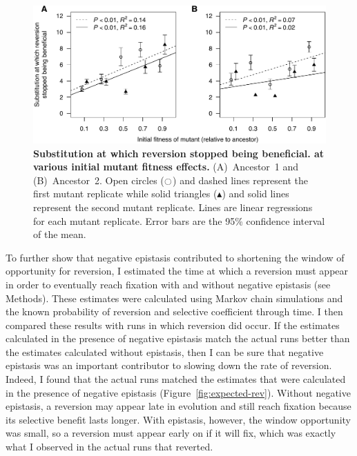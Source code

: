 \begin{doublespace}
\begin{figure}[b!]
\begin{center}
\includegraphics[width=\linewidth]{first-mut-rev-bad-W.pdf}
\end{center}
\caption{{\bf Substitution at which reversion stopped being beneficial.
  at various initial mutant fitness effects.}
  (A)~Ancestor~1 and (B)~Ancestor~2.
  Open circles ($\ocircle$) and dashed lines
  represent the first mutant replicate
  while solid triangles ($\blacktriangle$) and solid lines
  represent the second mutant replicate.
  Lines are linear regressions for each mutant replicate.
  Error bars are the 95\% confidence interval of the mean.}
\label{fig:first-mut-rev-bad-W}
\end{figure}



To further show that negative epistasis contributed
to shortening the window of opportunity for reversion,
I estimated the time at which a reversion must appear
in order to eventually reach fixation
with and without negative epistasis (see Methods).
%
These estimates were calculated using Markov chain simulations
and the known probability of reversion and selective coefficient through time.
%
I then compared these results with runs in which reversion did occur.
%
If the estimates calculated in the presence of negative epistasis
match the actual runs better than the estimates calculated without epistasis,
then I can be sure that negative epistasis
was an important contributor to slowing down the rate of reversion.
%
Indeed, I found that the actual runs matched the estimates
that were calculated in the presence of negative epistasis
(Figure~\ref{fig:expected-rev}).
%
Without negative epistasis, a reversion may appear late in evolution
and still reach fixation because its selective benefit lasts longer.
%
With epistasis, however, the window opportunity was small,
so a reversion must appear early on if it will fix,
which was exactly what I observed in the actual runs that reverted.




\end{doublespace}
